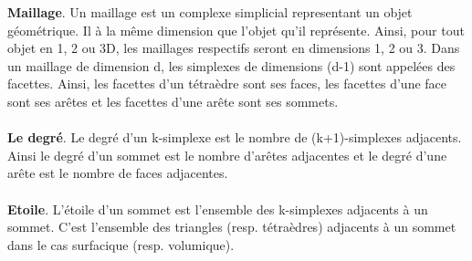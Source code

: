 \documentclass[a4paper,11pt,openany]{article}
\begin{document}
\textbf{Maillage}. Un maillage est un complexe simplicial representant un objet géométrique. Il à la même dimension que l'objet qu'il représente. Ainsi, pour tout objet en 1, 2 ou 3D, les maillages respectifs seront en dimensions 1, 2 ou 3. Dans un maillage de dimension d, les simplexes de dimensions (d-1) sont appelées des facettes. Ainsi, les facettes d'un tétraèdre sont ses faces, les facettes d'une face sont ses arêtes et les facettes d'une arête sont ses sommets.\\\\
\textbf{Le degré}. Le degré d'un k-simplexe est le nombre de (k+1)-simplexes adjacents. Ainsi le degré d'un sommet est le nombre d'arêtes adjacentes et le degré d'une arête est le nombre de faces adjacentes.\\\\
\textbf{Etoile}. L'étoile d'un sommet est l'ensemble des k-simplexes adjacents à un sommet. C'est l'ensemble des triangles (resp. tétraèdres) adjacents à un sommet dans le cas surfacique (resp. volumique).\\\\
\end{document}
